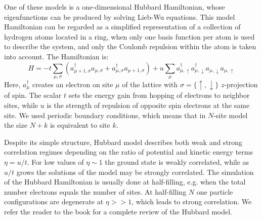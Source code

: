 One of these models is a one-dimensional Hubbard Hamiltonian, 
whose eigenfunctions can be produced by solving Lieb-Wu 
equations.\cite{lieb1968absence} This model Hamiltonian can be regarded as a 
simplified representation of a collection of hydrogen atoms located in a 
ring, when only one basis function per atom is used to describe the system, 
and only the Coulomb repulsion within the atom is taken into account. 
The Hamiltonian is:
\begin{equation}
 H = - t \sum_{\mu, \sigma} (a^\dagger_{\mu + 1, \sigma} a_{\mu, 
\sigma} + a^\dagger_{\mu, \sigma} a_{\mu + 1, 
\sigma}) + u \sum_{\mu} a^\dagger_{\mu, \uparrow} a^\dagger_{\mu, \downarrow} 
a_{\mu, \downarrow} a_{\mu, \uparrow}
\end{equation}
Here, $a^\dagger_{\mu}$ creates an electron on site $\mu$ of the lattice with 
$\sigma = \{ \uparrow, \downarrow \}$ $z$-projection of
spin. The scalar $t$ sets the energy gain from hopping of electrons to neighbor 
sites, while $u$ is the strength of repulsion of opposite spin electrons 
at the same site. We used periodic boundary conditions, which means that in 
$N$-site model the size $N + k$ is equivalent to site $k$.

Despite its simple structure, Hubbard model describes both weak and strong 
correlation regimes depending on the ratio of potential and kinetic energy 
terms $\eta = u / t$. For low values of $\eta \sim 1$ the ground state is 
weakly correlated, while as $u / t$ grows the solutions of the model may be 
strongly correlated. The simulation of the Hubbard Hamiltonian is usually done 
at half-filling, e.g. when the total number electrons equals the number of 
sites. At half-filling $N$ one particle configurations are degenerate at $\eta 
>> 1$, which leads to strong correlation. We refer the reader to the 
book\cite{essler2005one} for a complete review of the Hubbard model.
